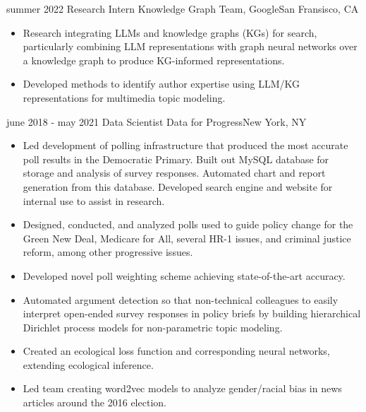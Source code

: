 \begin{cventries}



    \cventry
    {summer 2022}
    {Research Intern}
    {Knowledge Graph Team, Google}{San Fransisco, CA}
    {\vspace{-4mm}\begin{itemize}[leftmargin=5mm]
        \item Research integrating LLMs and knowledge graphs (KGs) for search, particularly combining LLM representations with graph neural networks over a knowledge graph to produce KG-informed representations.
        \item Developed methods to identify author expertise using LLM/KG representations for multimedia topic modeling.
     \end{itemize}}\vspace{-4mm}

  \cventry
    {june 2018 - may 2021}
    {Data Scientist}
    {Data for Progress}{New York, NY}
    {\vspace{-4mm}
     \begin{itemize}[leftmargin=5mm]
     	  \item Led development of polling infrastructure that produced the most accurate poll results in the Democratic Primary. Built out MySQL database for storage and analysis of survey responses. Automated chart and report generation from this database. Developed search engine and website for internal use to assist in research.
     	  \item Designed, conducted, and analyzed polls used to guide policy change for the Green New Deal, Medicare for All, several HR-1 issues, and criminal justice reform, among other progressive issues.
          \item Developed novel poll weighting scheme achieving state-of-the-art accuracy.
          \item Automated argument detection so that non-technical colleagues to easily interpret open-ended survey responses in policy briefs by building hierarchical Dirichlet process models for non-parametric topic modeling.
          \item Created an ecological loss function and corresponding neural networks, extending ecological inference.
        \item Led team creating word2vec models to analyze gender/racial bias in news articles around the 2016 election.
     \end{itemize}}\vspace{-4mm}
     

\end{cventries}
